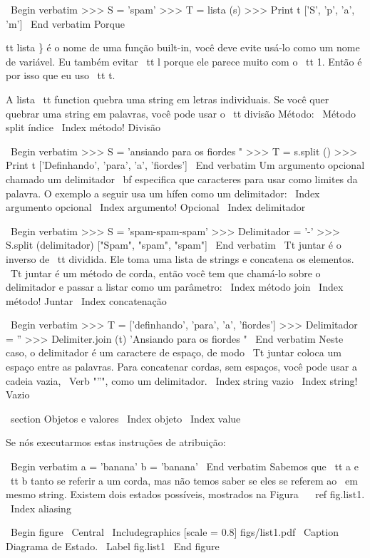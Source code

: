 \documentclass[10pt]{book}
\begin{document}
\begin {itemize}
{{{{{{\ Begin {verbatim}
>>> S = 'spam'
>>> T = lista (s)
>>> Print t
['S', 'p', 'a', 'm']
\ End {verbatim}
%
Porque {tt lista \} é o nome de uma função built-in, você deve
evite usá-lo como um nome de variável. Eu também evitar {\ tt l} porque
ele parece muito com o {\ tt 1}. Então é por isso que eu uso {\ tt t}.

A lista {\ tt} function quebra uma string em letras individuais. Se
você quer quebrar uma string em palavras, você pode usar o {\ tt divisão}
Método:
\ {Método split} índice
\ Index {método! Divisão}

\ Begin {verbatim}
>>> S = 'ansiando para os fiordes "
>>> T = s.split ()
>>> Print t
['Definhando', 'para', 'a', 'fiordes']
\ End {verbatim}
%
Um argumento opcional chamado um delimitador {\ bf} especifica que
caracteres para usar como limites da palavra.
O exemplo a seguir
usa um hífen como um delimitador:
\ Index {argumento opcional}
\ Index {argumento! Opcional}
\ Index {delimitador}

\ Begin {verbatim}
>>> S = 'spam-spam-spam'
>>> Delimitador = '-'
>>> S.split (delimitador)
["Spam", "spam", "spam"]
\ End {verbatim}
%
{\ Tt juntar} é o inverso de {\ tt dividida}. Ele
toma uma lista de strings e
concatena os elementos. {\ Tt juntar} é um método de corda,
então você tem que chamá-lo sobre o delimitador e passar a
listar como um parâmetro:
\ Index {método join}
\ Index {método! Juntar}
\ Index {concatenação}

\ Begin {verbatim}
>>> T = ['definhando', 'para', 'a', 'fiordes']
>>> Delimitador = ''
>>> Delimiter.join (t)
'Ansiando para os fiordes "
\ End {verbatim}
%
Neste caso, o delimitador é um caractere de espaço, de modo
{\ Tt juntar} coloca um espaço entre as palavras. Para concatenar
cordas, sem espaços, você pode usar a cadeia vazia,
\ Verb "''", como um delimitador. 
\ Index {string vazio}
\ Index {string! Vazio}


\ section {Objetos e valores}
\ Index {objeto}
\ Index {value}

Se nós executarmos estas instruções de atribuição:

\ Begin {verbatim}
a = 'banana'
b = 'banana'
\ End {verbatim}
%
Sabemos que {\ tt a} e {\ tt b} tanto se referir a um
corda, mas não temos
saber se eles se referem ao {\ em mesmo} string.
Existem dois estados possíveis, mostrados na Figura ~ \ ref {fig.list1}.
\ Index {aliasing}

\ Begin {figure}
\ Central
{\ Includegraphics [scale = 0.8] {figs/list1.pdf}}
\ Caption {Diagrama de Estado.}
\ Label {} fig.list1
\ End {figure}


}}}}}}}
\end{itemize}
\end{document}
